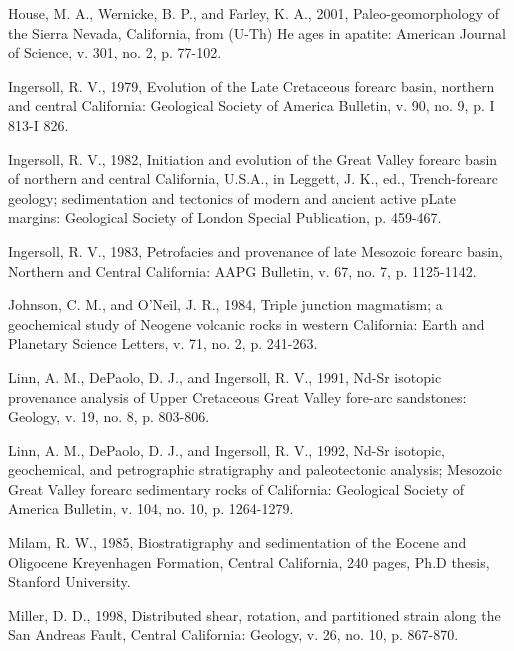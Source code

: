 \documentclass[11pt,twoside]{article}
\begin{document}
\begin{description}
\item  House,  M.  A., Wernicke,  B.  P.,  and  Farley, K.  A.,  2001,
Paleo-geomorphology of  the Sierra Nevada, California,  from (U-Th) He
ages  in  apatite:  American  Journal  of  Science,  v.  301,  no.  2,
p. 77-102.

\item Ingersoll, R. V., 1979, Evolution of the Late Cretaceous forearc
basin, northern and central  California: Geological Society of America
Bulletin, v. 90, no. 9, p. I 813-I 826.

\item Ingersoll,  R. V., 1982,  Initiation and evolution of  the Great
Valley forearc  basin of northern  and central California,  U.S.A., in
Leggett,  J.   K.,  ed.,  Trench-forearc  geology;  sedimentation  and
tectonics  of  modern and  ancient  active  pLate margins:  Geological
Society of London Special Publication, p. 459-467.

\item  Ingersoll, R.   V., 1983,  Petrofacies and  provenance  of late
Mesozoic  forearc   basin,  Northern  and   Central  California:  AAPG
Bulletin, v. 67, no. 7, p. 1125-1142.

\item  Johnson,  C. M.,  and  O'Neil,  J.  R., 1984,  Triple  junction
magmatism; a  geochemical study of  Neogene volcanic rocks  in western
California:  Earth  and  Planetary  Science  Letters, v.  71,  no.  2,
p. 241-263.

\item Linn, A.  M., DePaolo, D. J., and Ingersoll,  R. V., 1991, Nd-Sr
isotopic provenance analysis of Upper Cretaceous Great Valley fore-arc
sandstones: Geology, v. 19, no. 8, p. 803-806.

\item Linn, A.  M., DePaolo, D. J., and Ingersoll,  R. V., 1992, Nd-Sr
isotopic, geochemical, and petrographic stratigraphy and paleotectonic
analysis;   Mesozoic  Great  Valley   forearc  sedimentary   rocks  of
California: Geological  Society of America  Bulletin, v. 104,  no. 10,
p. 1264-1279.

\item  Milam, R. W.,  1985, Biostratigraphy  and sedimentation  of the
Eocene  and Oligocene Kreyenhagen  Formation, Central  California, 240
pages, Ph.D thesis, Stanford University.

\item  Miller,   D.  D.,   1998,  Distributed  shear,   rotation,  and
partitioned strain  along the  San Andreas Fault,  Central California:
Geology, v. 26, no. 10, p. 867-870.


\end{description}
\end{document}
